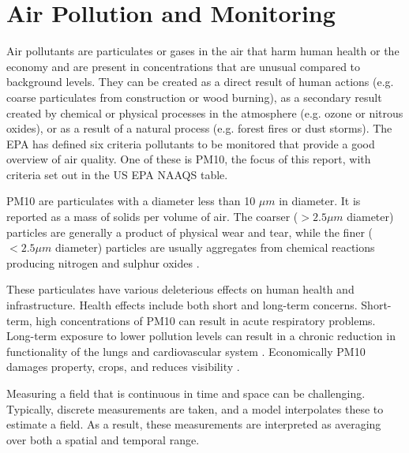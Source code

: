 \section{Air Pollution and Monitoring}\label{sec:introdairpollution}
Air pollutants are particulates or gases in the air that harm human health or the economy and are present in concentrations that are unusual compared to background levels.  They can be created as a direct result of human actions (e.g. coarse particulates from construction or wood burning), as a secondary result created by chemical or physical processes in the atmosphere (e.g. ozone or nitrous oxides), or as a result of a natural process (e.g. forest fires or dust storms).  The EPA has defined six criteria pollutants to be monitored that provide a good overview of air quality.  One of these is PM10, the focus of this report,  with criteria set out in the US EPA NAAQS table.

PM10 are particulates with a diameter less than 10 $\mu m$ in diameter.  It is reported as a mass of solids per volume of air.  The coarser ($> 2.5 \mu m$ diameter) particles are generally a product of physical wear and tear, while the finer ($< 2.5 \mu m$ diameter) particles are usually aggregates from chemical reactions producing nitrogen and sulphur oxides
.

These particulates have various deleterious effects on human health and infrastructure.  Health effects include both short and long-term concerns.  Short-term, high concentrations of PM10 can result in acute respiratory problems.  Long-term exposure to lower pollution levels can result in a chronic reduction in functionality of the lungs and cardiovascular system %
.  Economically PM10 damages property, crops, and reduces visibility
.

Measuring a field that is continuous in time and space can be challenging.  Typically, discrete measurements are taken, and a model interpolates these to estimate a field.  As a result, these measurements are interpreted as averaging over both a spatial and temporal range.

